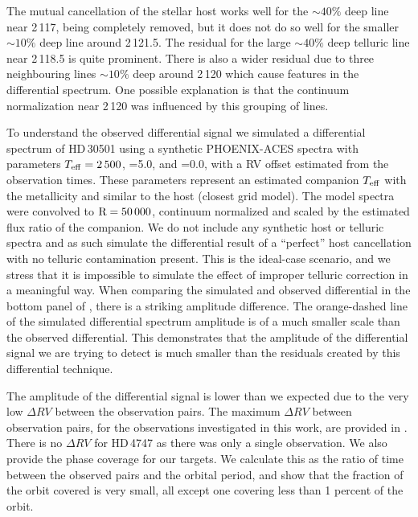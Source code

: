 The mutual cancellation of the stellar host works well for the \(\sim40\%\) deep line near 2\,117\nm{}, being completely removed, but it does not do so well for the smaller \(\sim10\%\) deep line around 2\,121.5\nm{}. The residual for the large \(\sim40\%\) deep telluric line near 2\,118.5\nm{} is quite prominent. There is also a wider residual due to three neighbouring lines \(\sim10\%\) deep around 2\,120\nm{} which cause features in the differential spectrum. One possible explanation is that the continuum normalization near 2\,120\nm{} was influenced by this grouping of lines.

To understand the observed differential signal we simulated a differential spectrum of {HD\,30501} using a synthetic {PHOENIX-ACES} spectra with parameters \(T_{\mathrm{eff}}{}=2\,500\)\K{}, \logg{}=5.0, and \feh{}=0.0, with a {RV} offset estimated from the observation times. These parameters represent an estimated companion \(T_{\mathrm{eff}}{}\) with the metallicity and \logg{} similar to the host (closest grid model). The model spectra were convolved to \(\rm R=50\,000\), continuum normalized and scaled by the estimated flux ratio of the companion. We do not include any synthetic host or telluric spectra and as such simulate the differential result of a ``perfect'' host cancellation with no telluric contamination present. This is the ideal-case scenario, and we stress that it is impossible to simulate the effect of improper telluric correction in a meaningful way. When comparing the simulated and observed differential in the bottom panel of , there is a striking amplitude difference. The orange-dashed line of the simulated differential spectrum amplitude is of a much smaller scale than the observed differential. This demonstrates that the amplitude of the differential signal we are trying to detect is much smaller than the residuals created by this differential technique.

The amplitude of the differential signal is lower than we expected due to the very low \(\Delta {RV}\) between the observation pairs. The maximum \(\Delta {RV}\) between observation pairs, for the observations investigated in this work, are provided in . {\red{} There is no \(\Delta {RV}\) for {HD\,4747} as there was only a single observation. We also provide the phase coverage for our targets. We calculate this as the ratio of time between the observed pairs and the orbital period, and show that the fraction of the orbit covered is very small, all except one covering less than 1 percent of the orbit.}

